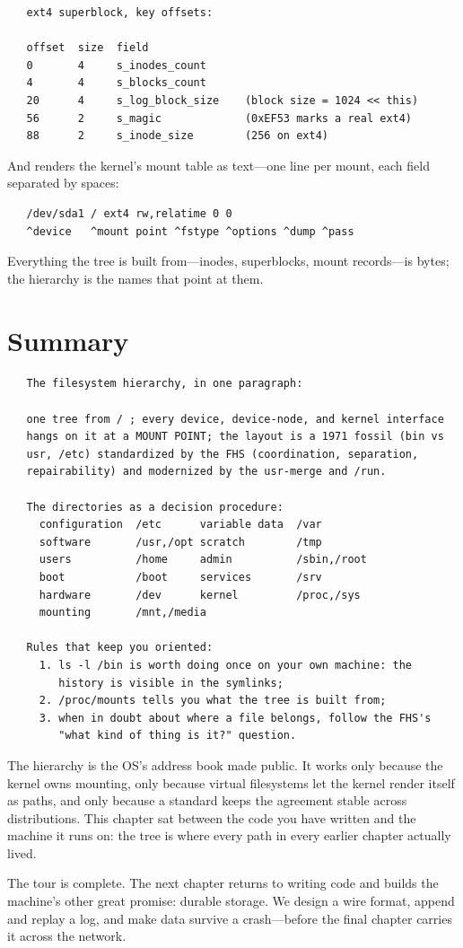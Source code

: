 \begin{verbatim}
   ext4 superblock, key offsets:

   offset  size  field
   0       4     s_inodes_count
   4       4     s_blocks_count
   20      4     s_log_block_size    (block size = 1024 << this)
   56      2     s_magic             (0xEF53 marks a real ext4)
   88      2     s_inode_size        (256 on ext4)
\end{verbatim}

And  renders the kernel's mount table as text---one
line per mount, each field separated by spaces:

\begin{verbatim}
   /dev/sda1 / ext4 rw,relatime 0 0
   ^device   ^mount point ^fstype ^options ^dump ^pass
\end{verbatim}

Everything the tree is built from---inodes, superblocks, mount
records---is bytes; the hierarchy is the names that point at them.

\section{Summary}

\begin{verbatim}
   The filesystem hierarchy, in one paragraph:

   one tree from / ; every device, device-node, and kernel interface
   hangs on it at a MOUNT POINT; the layout is a 1971 fossil (bin vs
   usr, /etc) standardized by the FHS (coordination, separation,
   repairability) and modernized by the usr-merge and /run.

   The directories as a decision procedure:
     configuration  /etc      variable data  /var
     software       /usr,/opt scratch        /tmp
     users          /home     admin          /sbin,/root
     boot           /boot     services       /srv
     hardware       /dev      kernel         /proc,/sys
     mounting       /mnt,/media

   Rules that keep you oriented:
     1. ls -l /bin is worth doing once on your own machine: the
        history is visible in the symlinks;
     2. /proc/mounts tells you what the tree is built from;
     3. when in doubt about where a file belongs, follow the FHS's
        "what kind of thing is it?" question.
\end{verbatim}

\begin{osconcept}
The hierarchy is the OS's address book made public. It works only
because the kernel owns mounting, only because virtual filesystems let
the kernel render itself as paths, and only because a standard keeps
the agreement stable across distributions. This chapter sat between
the code you have written and the machine it runs on: the tree is
where every path in every earlier chapter actually lived.
\end{osconcept}

The tour is complete. The next chapter returns to writing code and
builds the machine's other great promise: durable storage. We design a
wire format, append and replay a log, and make data survive a
crash---before the final chapter carries it across the network.


